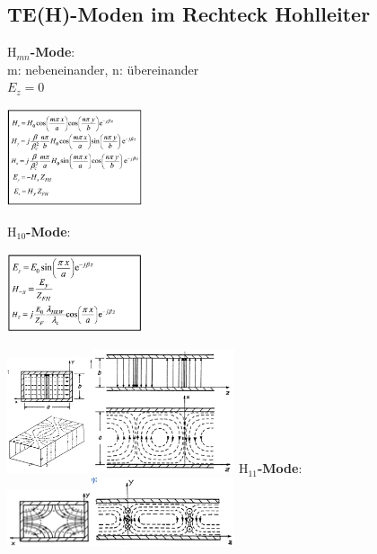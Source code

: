 \documentclass[english]{latex4ei/latex4ei_sheet}
\begin{document}
\begin{sectionbox}
	\subsection{TE(H)-Moden im Rechteck Hohlleiter}
	\textbf{$\text{H}_{mn}$-Mode}:\\
	m: nebeneinander, n: übereinander\\
	$E_z = 0$
	\begin{center}\includegraphics[width = 4cm]{./img/Hmn.png}\end{center}


	\textbf{$\text{H}_{10}$-Mode}:
	\begin{center}\includegraphics[width = 4cm]{./img/H10.png}\end{center}
	\includegraphics[width = 2.5cm]{./img/H10-comb.jpeg}\includegraphics[width = 4.2cm]{./img/H10-bild2.png}
	\textbf{$\text{H}_{11}$-Mode}:\\
	\includegraphics[width = 2.5cm]{./img/H11-bild1.png}\includegraphics[width = 4.2cm]{./img/H11-bild2.png}
\end{sectionbox}
\end{document}
